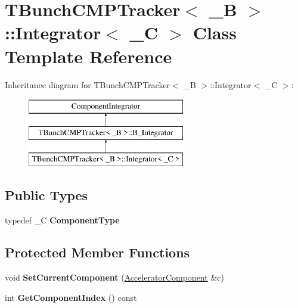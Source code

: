 \hypertarget{classTBunchCMPTracker_1_1Integrator}{}\section{T\+Bunch\+C\+M\+P\+Tracker$<$ \+\_\+B $>$\+:\+:Integrator$<$ \+\_\+C $>$ Class Template Reference}
\label{classTBunchCMPTracker_1_1Integrator}
Inheritance diagram for T\+Bunch\+C\+M\+P\+Tracker$<$ \+\_\+B $>$\+:\+:Integrator$<$ \+\_\+C $>$\+:\begin{figure}[H]
\begin{center}
\leavevmode
\includegraphics[height=3.000000cm]{classTBunchCMPTracker_1_1Integrator}
\end{center}
\end{figure}
\subsection*{Public Types}
\begin{DoxyCompactItemize}
\item 
\mbox{\label{classTBunchCMPTracker_1_1Integrator_a10098d2f1d1f8455c6f8d5abac7e3e23}} 
typedef \+\_\+C {\bfseries Component\+Type}
\end{DoxyCompactItemize}
\subsection*{Protected Member Functions}
\begin{DoxyCompactItemize}
\item 
\mbox{\label{classTBunchCMPTracker_1_1Integrator_a791ce5aa87621e15c81181a47e8ef429}} 
void {\bfseries Set\+Current\+Component} (\hyperlink{classAcceleratorComponent}{Accelerator\+Component} \&c)
\item 
\mbox{\label{classTBunchCMPTracker_1_1Integrator_a9d7564294ec65927814aa895393bd401}} 
int {\bfseries Get\+Component\+Index} () const
\end{DoxyCompactItemize}
